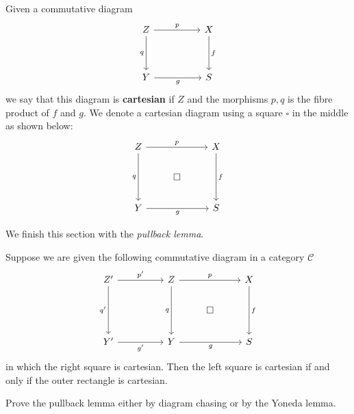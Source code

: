 \documentclass[12pt]{book}
\newcommand{\inlinedef}[1]{\textcolor{oxfordblue}{\bfseries #1}}
\theoremstyle{definition}
\begin{document}
	Given a commutative diagram
	\[\begin{tikzcd}
		Z && X \\
		\\
		Y && {S}
		\arrow["p", from=1-1, to=1-3]
		\arrow["q"', from=1-1, to=3-1]
		\arrow["f", from=1-3, to=3-3]
		\arrow["g"', from=3-1, to=3-3]
	\end{tikzcd}\]
	we say that this diagram is \inlinedef{cartesian} if $Z$ and the morphisms $p, q$ is the fibre product of $f$ and $g$. We denote a cartesian diagram using a square $\square$ in the middle as shown below:
	\[\begin{tikzcd}
		Z && X \\
		& \square \\
		Y && S
		\arrow["p", from=1-1, to=1-3]
		\arrow["q"', from=1-1, to=3-1]
		\arrow["f", from=1-3, to=3-3]
		\arrow["g"', from=3-1, to=3-3]
	\end{tikzcd}\]
	
	We finish this section with the \textit{pullback lemma}.
	
	\begin{lemma} Suppose we are given the following commutative diagram in a category $\mathcal{C}$
		\[\begin{tikzcd}
			{Z'} && Z && X \\
			&&& \square \\
			{Y'} && Y && S
			\arrow["{p'}", from=1-1, to=1-3]
			\arrow["{q'}"', from=1-1, to=3-1]
			\arrow["p", from=1-3, to=1-5]
			\arrow["q"', from=1-3, to=3-3]
			\arrow["f", from=1-5, to=3-5]
			\arrow["{g'}"', from=3-1, to=3-3]
			\arrow["g"', from=3-3, to=3-5]
		\end{tikzcd}\]
		in which the right square is cartesian. Then the left square is cartesian if and only if the outer rectangle is cartesian.
	\end{lemma}
	\begin{exercise}
		Prove the pullback lemma either by diagram chasing or by  the Yoneda lemma.
	\end{exercise}
	
\end{document}
